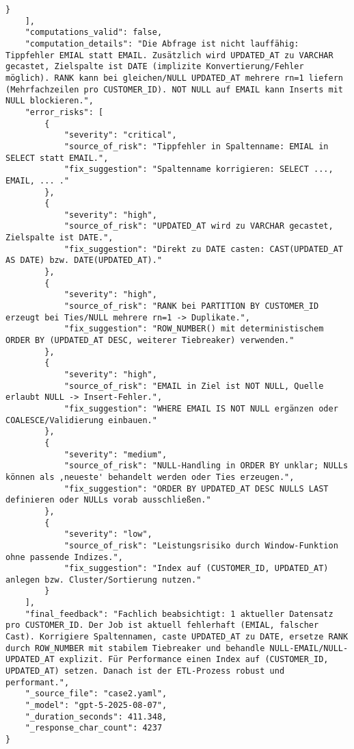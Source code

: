 \begin{lstlisting}[caption={Ausgabe: GPT-5 Anwendungsfall 2 Konsistenzdurchlauf},label={gpt_case2_prompt2}]
        }
    ],
    "computations_valid": false,
    "computation_details": "Die Abfrage ist nicht lauffähig: Tippfehler EMIAL statt EMAIL. Zusätzlich wird UPDATED_AT zu VARCHAR gecastet, Zielspalte ist DATE (implizite Konvertierung/Fehler möglich). RANK kann bei gleichen/NULL UPDATED_AT mehrere rn=1 liefern (Mehrfachzeilen pro CUSTOMER_ID). NOT NULL auf EMAIL kann Inserts mit NULL blockieren.",
    "error_risks": [
        {
            "severity": "critical",
            "source_of_risk": "Tippfehler in Spaltenname: EMIAL in SELECT statt EMAIL.",
            "fix_suggestion": "Spaltenname korrigieren: SELECT ..., EMAIL, ... ."
        },
        {
            "severity": "high",
            "source_of_risk": "UPDATED_AT wird zu VARCHAR gecastet, Zielspalte ist DATE.",
            "fix_suggestion": "Direkt zu DATE casten: CAST(UPDATED_AT AS DATE) bzw. DATE(UPDATED_AT)."
        },
        {
            "severity": "high",
            "source_of_risk": "RANK bei PARTITION BY CUSTOMER_ID erzeugt bei Ties/NULL mehrere rn=1 -> Duplikate.",
            "fix_suggestion": "ROW_NUMBER() mit deterministischem ORDER BY (UPDATED_AT DESC, weiterer Tiebreaker) verwenden."
        },
        {
            "severity": "high",
            "source_of_risk": "EMAIL in Ziel ist NOT NULL, Quelle erlaubt NULL -> Insert-Fehler.",
            "fix_suggestion": "WHERE EMAIL IS NOT NULL ergänzen oder COALESCE/Validierung einbauen."
        },
        {
            "severity": "medium",
            "source_of_risk": "NULL-Handling in ORDER BY unklar; NULLs können als ,neueste' behandelt werden oder Ties erzeugen.",
            "fix_suggestion": "ORDER BY UPDATED_AT DESC NULLS LAST definieren oder NULLs vorab ausschließen."
        },
        {
            "severity": "low",
            "source_of_risk": "Leistungsrisiko durch Window-Funktion ohne passende Indizes.",
            "fix_suggestion": "Index auf (CUSTOMER_ID, UPDATED_AT) anlegen bzw. Cluster/Sortierung nutzen."
        }
    ],
    "final_feedback": "Fachlich beabsichtigt: 1 aktueller Datensatz pro CUSTOMER_ID. Der Job ist aktuell fehlerhaft (EMIAL, falscher Cast). Korrigiere Spaltennamen, caste UPDATED_AT zu DATE, ersetze RANK durch ROW_NUMBER mit stabilem Tiebreaker und behandle NULL-EMAIL/NULL-UPDATED_AT explizit. Für Performance einen Index auf (CUSTOMER_ID, UPDATED_AT) setzen. Danach ist der ETL-Prozess robust und performant.",
    "_source_file": "case2.yaml",
    "_model": "gpt-5-2025-08-07",
    "_duration_seconds": 411.348,
    "_response_char_count": 4237
}
\end{lstlisting}

